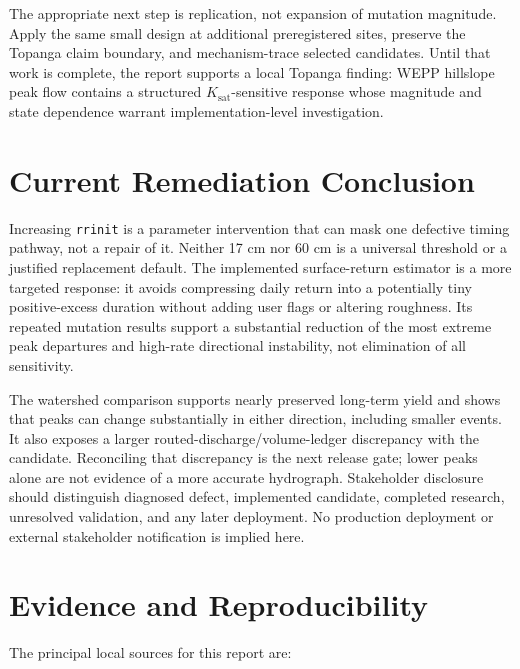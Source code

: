\documentclass[11pt]{article}
\newcommand{\Ksat}{\ensuremath{K_{\mathrm{sat}}}}
\begin{document}
The appropriate next step is replication, not expansion of mutation magnitude.
Apply the same small design at additional preregistered sites, preserve the
Topanga claim boundary, and mechanism-trace selected candidates. Until that
work is complete, the report supports a local Topanga finding: WEPP hillslope
peak flow contains a structured \Ksat-sensitive response whose magnitude and
state dependence warrant implementation-level investigation.

\section{Current Remediation Conclusion}

Increasing \texttt{rrinit} is a parameter intervention that can mask one
defective timing pathway, not a repair of it. Neither 17 cm nor 60 cm is a
universal threshold or a justified replacement default. The implemented
surface-return estimator is a more targeted response: it avoids compressing
daily return into a potentially tiny positive-excess duration without adding
user flags or altering roughness. Its repeated mutation results support a
substantial reduction of the most extreme peak departures and high-rate
directional instability, not elimination of all sensitivity.

The watershed comparison supports nearly preserved long-term yield and shows
that peaks can change substantially in either direction, including smaller
events. It also exposes a larger routed-discharge/volume-ledger discrepancy
with the candidate. Reconciling that discrepancy is the next release gate;
lower peaks alone are not evidence of a more accurate hydrograph. Stakeholder
disclosure should distinguish diagnosed defect, implemented candidate,
completed research, unresolved validation, and any later deployment. No
production deployment or external stakeholder notification is implied here.

\section*{Evidence and Reproducibility}

The principal local sources for this report are:
\end{document}
